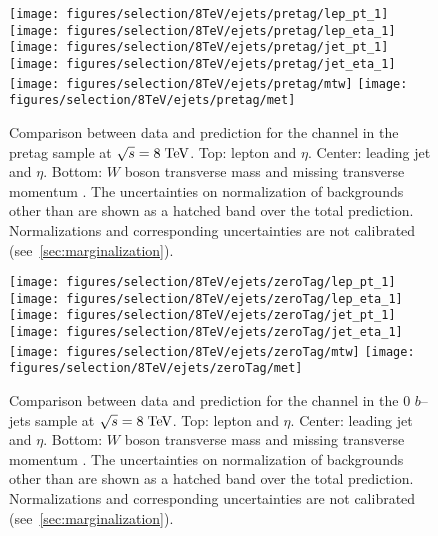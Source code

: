 \begin{figure}
  \centering
  \texttt{[image: figures/selection/8TeV/ejets/pretag/lep\_pt\_1]}
  \texttt{[image: figures/selection/8TeV/ejets/pretag/lep\_eta\_1]}
  \texttt{[image: figures/selection/8TeV/ejets/pretag/jet\_pt\_1]}
  \texttt{[image: figures/selection/8TeV/ejets/pretag/jet\_eta\_1]}
  \texttt{[image: figures/selection/8TeV/ejets/pretag/mtw]}
  \texttt{[image: figures/selection/8TeV/ejets/pretag/met]}
  \caption{
    Comparison between data and prediction for the \ejets{}
    channel in the pretag sample at $\sqrt{s} = 8 \; \mathrm{TeV}{}$. Top: lepton \pt{} and
    $\eta$. Center: leading jet \pt{} and $\eta$. Bottom: $W$ boson
    transverse mass \mtw{} and missing transverse momentum \met{}.
    The uncertainties on normalization of backgrounds other than
    \wjets{} are shown as a hatched band over the total prediction.
    Normalizations and corresponding uncertainties are not calibrated
    (see~\ref{sec:marginalization}).
  }
  \label{fig:2012ele_pretag}
\end{figure}
%
\begin{figure}
  \centering
  \texttt{[image: figures/selection/8TeV/ejets/zeroTag/lep\_pt\_1]}
  \texttt{[image: figures/selection/8TeV/ejets/zeroTag/lep\_eta\_1]}
  \texttt{[image: figures/selection/8TeV/ejets/zeroTag/jet\_pt\_1]}
  \texttt{[image: figures/selection/8TeV/ejets/zeroTag/jet\_eta\_1]}
  \texttt{[image: figures/selection/8TeV/ejets/zeroTag/mtw]}
  \texttt{[image: figures/selection/8TeV/ejets/zeroTag/met]}
  \caption{
    Comparison between data and prediction for the \ejets{}
    channel in the 0 $b$--jets sample at $\sqrt{s} = 8 \; \mathrm{TeV}{}$. Top: lepton \pt{} and
    $\eta$. Center: leading jet \pt{} and $\eta$. Bottom: $W$ boson
    transverse mass \mtw{} and missing transverse momentum \met{}.
    The uncertainties on normalization of backgrounds other than
    \wjets{} are shown as a hatched band over the total prediction.
    Normalizations and corresponding uncertainties are not calibrated
    (see~\ref{sec:marginalization}).
  }
  \label{fig:2012ele_0tag}
\end{figure}
%
